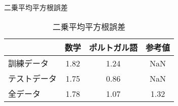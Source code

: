 \documentclass[9pt]{ltjsarticle}
\begin{document}
\newpage
    \begin{center}
    \end{center}
    { \hspace*{\fill} \\}
    
    \begin{center}
    \end{center}
    
    \begin{center}
    \end{center}
    
         \begin{table}[h]
\caption{二乗平均平方根誤差}
\begin{center}
二乗平均平方根誤差\\
\begin{tabular}{l|ccc}
     &    数学 & ポルトガル語 &  参考値 \cite{cortez} \\
      \hline \hline
訓練データ  & 1.82   & 1.24  & NaN \\
テストデータ & 1.75 &   0.86  & NaN \\
全データ   & 1.78 &   1.07  &1.32
\end{tabular}
\end{center}
\label{default}
\end{table}%

\newpage
\end{document}

